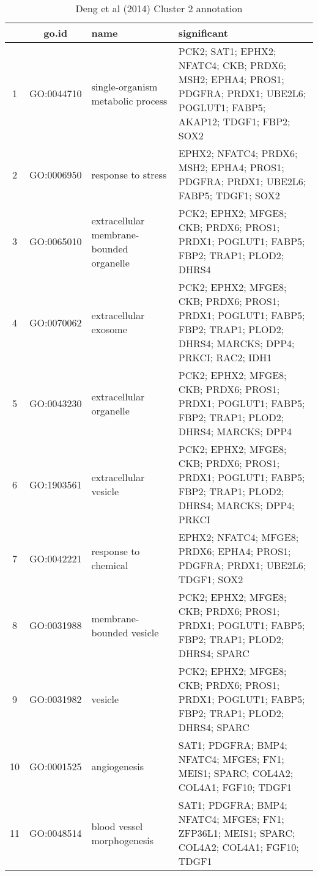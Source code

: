 \clearpage






\begin{table}[htp]
\begin{center}
\caption{Deng et al (2014) Cluster 2 annotation} \label{tab:tab6}
\begin{tabular}{|c|c|p{1.5in}|p{4in}|}
  \hline
 & go.id & name & significant \\ 
  \hline
1 & GO:0044710 & single-organism metabolic process & \footnotesize{PCK2; SAT1; EPHX2; NFATC4; CKB; PRDX6; MSH2; EPHA4; PROS1; PDGFRA; PRDX1; UBE2L6; POGLUT1; FABP5; AKAP12; TDGF1; FBP2; SOX2} \\ 
2 & GO:0006950 & response to stress & \footnotesize{EPHX2; NFATC4; PRDX6; MSH2; EPHA4; PROS1; PDGFRA; PRDX1; UBE2L6; FABP5; TDGF1; SOX2} \\ 
3 & GO:0065010 & extracellular membrane-bounded organelle & \footnotesize{PCK2; EPHX2; MFGE8; CKB; PRDX6; PROS1; PRDX1; POGLUT1; FABP5; FBP2; TRAP1; PLOD2; DHRS4} \\ 
4 & GO:0070062 & extracellular exosome  & \footnotesize{PCK2; EPHX2; MFGE8; CKB; PRDX6; PROS1; PRDX1; POGLUT1; FABP5; FBP2; TRAP1; PLOD2; DHRS4; MARCKS; DPP4; PRKCI; RAC2; IDH1} \\ 
5 & GO:0043230 & extracellular organelle & \footnotesize{PCK2; EPHX2; MFGE8; CKB; PRDX6; PROS1; PRDX1; POGLUT1; FABP5; FBP2; TRAP1; PLOD2; DHRS4; MARCKS; DPP4} \\ 
6 & GO:1903561 & extracellular vesicle & \footnotesize{PCK2; EPHX2; MFGE8; CKB; PRDX6; PROS1; PRDX1; POGLUT1; FABP5; FBP2; TRAP1; PLOD2; DHRS4; MARCKS; DPP4; PRKCI} \\ 
7 & GO:0042221 & response to chemical & \footnotesize{EPHX2; NFATC4; MFGE8; PRDX6; EPHA4; PROS1; PDGFRA; PRDX1; UBE2L6; TDGF1; SOX2} \\ 
8 & GO:0031988 & membrane-bounded vesicle & \footnotesize{PCK2; EPHX2; MFGE8; CKB; PRDX6; PROS1; PRDX1; POGLUT1; FABP5; FBP2; TRAP1; PLOD2; DHRS4; SPARC} \\ 
9 & GO:0031982 & vesicle & \footnotesize{PCK2; EPHX2; MFGE8; CKB; PRDX6; PROS1; PRDX1; POGLUT1; FABP5; FBP2; TRAP1; PLOD2; DHRS4; SPARC} \\ 
10 & GO:0001525 & angiogenesis & \footnotesize{SAT1; PDGFRA; BMP4; NFATC4; MFGE8; FN1; MEIS1; SPARC; COL4A2; COL4A1; FGF10; TDGF1} \\ 
11 & GO:0048514 & blood vessel morphogenesis & \footnotesize{SAT1; PDGFRA; BMP4; NFATC4; MFGE8; FN1; ZFP36L1; MEIS1; SPARC; COL4A2; COL4A1; FGF10; TDGF1} \\ 

\end{tabular}
\end{center}
\end{table}
